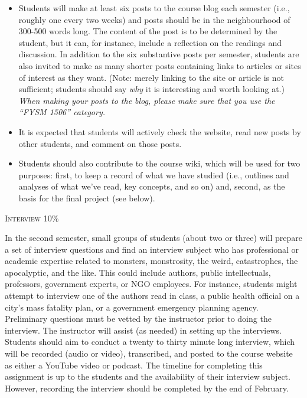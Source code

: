 \documentclass[12pt]{article}
\begin{document}
\begin{itemize}
\item Students will make at least six posts to the course blog each semester (i.e., roughly one every two weeks) and posts should be in the neighbourhood of 300-500 words long. The content of the post is to be determined by the student, but it can, for instance, include a reflection on the readings and discussion. In addition to the six substantive posts per semester, students are also invited to make as many shorter posts containing links to articles or sites of interest as they want. (Note: merely linking to the site or article is not sufficient; students should say \textit{why} it is interesting and worth looking at.) \textit{When making your posts to the blog, please make sure that you use the ``FYSM 1506'' category.}
\item It is expected that students will actively check the website, read new posts by other students, and comment on those posts.
\item Students should also contribute to the course wiki, which will be used for two purposes: first, to keep a record of what we have studied (i.e., outlines and analyses of what we've read, key concepts, and so on) and, second, as the basis for the final project (see below).
\end{itemize}

{\large \textsc{Interview 10\%}}

In the second semester, small groups of students (about two or three) will prepare a set of interview questions and find an interview subject who has professional or academic expertise related to monsters, monstrosity, the weird, catastrophes, the apocalyptic, and the like. This could include authors, public intellectuals, professors, government experts, or NGO employees. For instance, students might attempt to interview one of the authors read in class, a public health official on a city's mass fatality plan, or a government emergency planning agency. Preliminary questions must be vetted by the instructor prior to doing the interview. The instructor will assist (as needed) in setting up the interviews. Students should aim to conduct a twenty to thirty minute long interview, which will be recorded (audio or video), transcribed, and posted to the course website as either a YouTube video or podcast. The timeline for completing this assignment is up to the students and the availability of their interview subject. However, recording the interview should be completed by the end of February.
\end{document}
